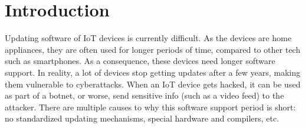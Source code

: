 \chapter{Introduction}
\label{chap:intro}

% 
% 
% 



Updating software of \acrfull{IoT} devices is currently difficult. As the devices are home appliances, they are often used for longer periods of time, compared to other tech such as smartphones. As a consequence, these devices need longer software support. In reality, a lot of devices stop getting updates after a few years, making them vulnerable to cyberattacks. When an \acrshort{IoT} device gets hacked, it can be used as part of a botnet, or worse, send sensitive info (such as a video feed) to the attacker. There are multiple causes to why this software support period is short: no standardized updating mechanisms, special hardware and compilers, etc.

